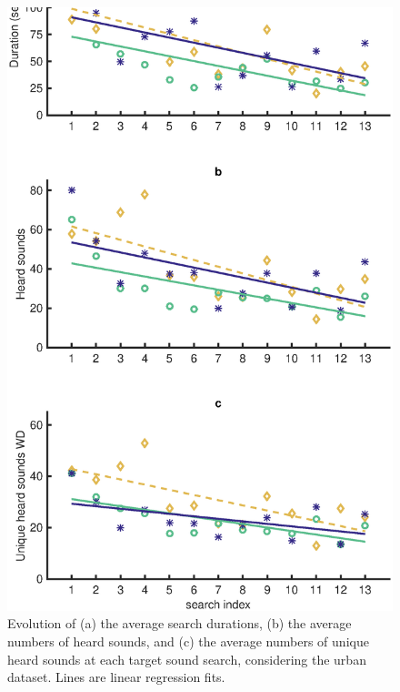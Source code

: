 \documentclass{aes2e}
\begin{document}
\begin{figure}[t]
\begin{center}
\includegraphics[width=\columnwidth]{gfx/analyse_urban2.eps} 
\end{center}
\caption{\label{fig2urban} Evolution of (a) the average search durations, (b) the average numbers of heard sounds, and (c) the average numbers of unique heard sounds at each target sound search, considering the urban dataset. Lines are linear regression fits.}
\end{figure}
\end{document}
